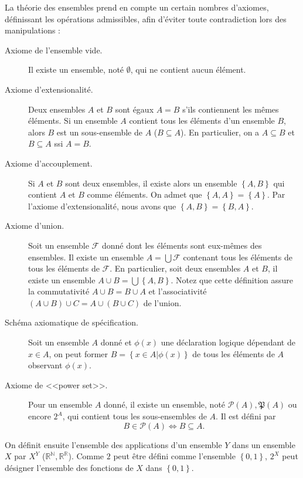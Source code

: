 La théorie des ensembles prend en compte un certain nombres d'axiomes, définissant les opérations admissibles, afin d'éviter toute contradiction lors des manipulations :
\begin{description}
    \item[Axiome de l'ensemble vide.] Il existe un ensemble, noté $\emptyset$, qui ne contient aucun élément.
    \item[Axiome d'extensionalité.] Deux ensembles $A$ et $B$ sont égaux $A=B$ s'ils contiennent les mêmes éléments. Si un ensemble $A$ contient tous les éléments d'un ensemble $B$, alors $B$ est un sous-ensemble de $A$ ($B\subseteq A$). En particulier, on a $A\subseteq B$ et $B\subseteq A$ ssi $A=B$.
    \item[Axiome d'accouplement.] Si $A$ et $B$ sont deux ensembles, il existe alors un ensemble $\left\{ A,B \right\}$ qui contient $A$ et $B$ comme éléments. On admet que $\left\{ A,A \right\} = \left\{ A \right\}$. Par l'axiome d'extensionalité, nous avons que $\left\{ A,B \right\} = \left\{ B,A \right\}$.
    \item[Axiome d'union.] Soit un ensemble $\mathcal{F}$ donné dont les éléments sont eux-mêmes des ensembles. Il existe un ensemble $A=\bigcup\mathcal{F}$ contenant tous les éléments de tous les éléments de $\mathcal{F}$. En particulier, soit deux ensembles $A$ et $B$, il existe un ensemble $A\cup B=\bigcup\left\{ A,B \right\}$. Notez que cette définition assure la commutativité $A\cup B = B\cup A$ et l'associativité $(A\cup B) \cup C = A\cup (B\cup C)$ de l'union.
    \item[Schéma axiomatique de spécification.] Soit un ensemble $A$ donné et $\phi(x)$ une déclaration logique dépendant de $x\in A$, on peut former $B=\left\{ x\in A | \phi(x) \right\}$ de tous les éléments de $A$ observant $\phi(x)$.
    \item[Axiome de <<power set>>.] Pour un ensemble $A$ donné, il existe un ensemble, noté $\mathcal{P}(A), \mathfrak{P}(A)$ ou encore $2^A$, qui contient tous les sous-ensembles de $A$. Il est défini par \[B \in \mathcal{P}(A) \Longleftrightarrow B \subseteq A.\]
\end{description}
On définit ensuite l'ensemble des applications d'un ensemble $Y$ dans un ensemble $X$ par $X^Y$ ($\mathbb{R}^\mathbb{N}, \mathbb{R}^\mathbb{R}$). Comme $2$ peut être défini comme l'ensemble $\left\{ 0,1 \right\}$, $2^X$ peut désigner l'ensemble des fonctions de $X$ dans $\left\{ 0,1 \right\}$. \\

